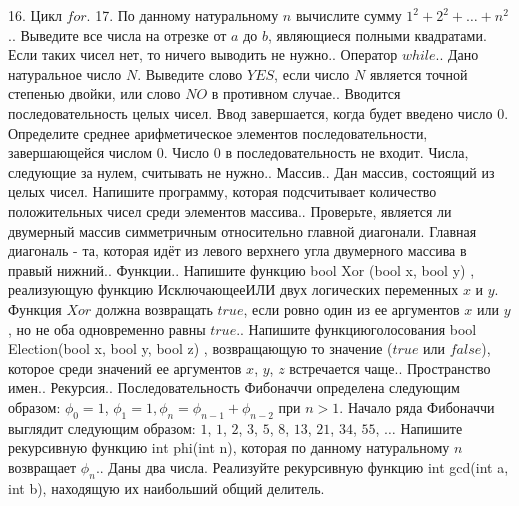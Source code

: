 \documentclass[a4paper,12pt]{article}
\begin{document}
16. Цикл $for$.
17. По данному натуральному $n$ вычислите сумму $1^2+2^2+\dots+n^2$.. Выведите все числа на отрезке от $a$ до $b$, являющиеся полными квадратами. Если таких чисел нет, то ничего выводить не нужно.. Оператор $while$.. Дано натуральное число $N$. Выведите слово $YES$, если число $N$ является точной степенью двойки, или слово $NO$ в противном случае.. Вводится последовательность целых чисел. Ввод завершается, когда будет введено число $0$. Определите среднее арифметическое элементов последовательности, завершающейся числом $0$. Число $0$ в последовательность не входит. Числа, следующие за нулем, считывать не нужно.. Массив.. Дан массив, состоящий из целых чисел. Напишите программу, которая подсчитывает количество положительных чисел среди элементов массива.. Проверьте, является ли двумерный массив симметричным относительно главной диагонали. Главная диагональ - та, которая идёт из левого верхнего угла двумерного массива в правый нижний.. Функции.. Напишите функцию\newline
bool Xor (bool x, bool y) {}, реализующую функцию $Исключающее ИЛИ$ двух логических переменных $x$ и $y$. Функция $Xor$ должна возвращать $true$, если ровно один из ее аргументов $x$ или $y$, но не оба одновременно равны $true$.. Напишите $функцию голосования$\newline
bool Election(bool x, bool y, bool z) {}, возвращающую то значение ($true$ или $false$), которое среди значений ее аргументов $x$, $y$, $z$ встречается чаще.. Пространство имен.. Рекурсия.. Последовательность Фибоначчи определена следующим образом: $\phi_0=1$, $\phi_1=1, \phi_n=\phi_{n-1}+\phi_{n-2}$ при $n>1$. Начало ряда Фибоначчи выглядит следующим образом: $1$, $1$, $2$, $3$, $5$, $8$, $13$, $21$, $34$, $55$, $\dots$ Напишите рекурсивную функцию\newline
int phi(int n), которая по данному натуральному $n$ возвращает $\phi_n$.. Даны два числа. Реализуйте рекурсивную функцию\newline
int gcd(int a, int b), находящую их наибольший общий делитель.\newline
\end{document}
